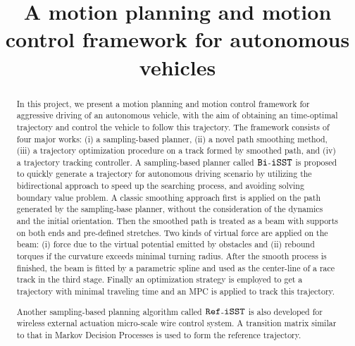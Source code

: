 \documentclass[conference, onecolumn]{IEEEtran}
\begin{document}
	\title{A motion planning and motion control framework for autonomous vehicles}

\begin{abstract}
	In this project, we present a motion planning and motion control framework for aggressive driving of an autonomous vehicle, with the aim of obtaining an time-optimal trajectory and control the vehicle to follow this trajectory. The framework consists of four major works: (i) a sampling-based planner, (ii) a novel path smoothing method, (iii) a trajectory optimization procedure on a track formed by smoothed path, and (iv) a trajectory tracking controller. A sampling-based planner called $\tt Bi$-$\tt iSST$ is proposed to quickly generate a trajectory for autonomous driving scenario by utilizing the bidirectional approach to speed up the searching process, and avoiding solving boundary value problem. A classic smoothing approach first is applied on the path generated by the sampling-base planner, without the consideration of the dynamics and the initial orientation. Then the smoothed path is treated as a beam with supports on both ends and pre-defined stretches. Two kinds of virtual force are applied on the beam: (i) force due to the virtual potential emitted by obstacles and (ii) rebound torques if the curvature exceeds minimal turning radius. After the smooth process is finished, the beam is fitted by a parametric spline and used as the center-line of a race track in the third stage. Finally an optimization strategy is employed to get a trajectory with minimal traveling time and an MPC is applied to track this trajectory. 
	
	Another sampling-based planning algorithm called $\tt Ref$-$\tt iSST$ is also developed for wireless external actuation micro-scale wire control system. A transition matrix similar to that in Markov Decision Processes is used to form the reference trajectory.
\end{abstract}
\end{document}
